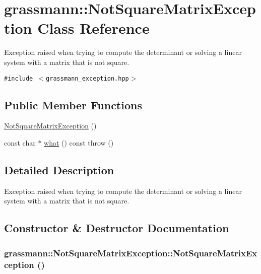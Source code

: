 \hypertarget{classgrassmann_1_1NotSquareMatrixException}{
\section{grassmann::NotSquareMatrixException Class Reference}
\label{classgrassmann_1_1NotSquareMatrixException}
}
Exception raised when trying to compute the determinant or solving a linear system with a matrix that is not square.  


{\tt \#include $<$grassmann\_\-exception.hpp$>$}

\subsection*{Public Member Functions}
\begin{CompactItemize}
\item 
\hyperlink{classgrassmann_1_1NotSquareMatrixException_61fd3c48f615478da87b29f2e1d95037}{NotSquareMatrixException} ()
\item 
const char $\ast$ \hyperlink{classgrassmann_1_1NotSquareMatrixException_2ea102b17f39f32f36dcc315a2ba473c}{what} () const   throw ()
\end{CompactItemize}


\subsection{Detailed Description}
Exception raised when trying to compute the determinant or solving a linear system with a matrix that is not square. 

\subsection{Constructor \& Destructor Documentation}
\hypertarget{classgrassmann_1_1NotSquareMatrixException_61fd3c48f615478da87b29f2e1d95037}{
\subsubsection[NotSquareMatrixException]{\setlength{\rightskip}{0pt plus 5cm}grassmann::NotSquareMatrixException::NotSquareMatrixException ()}}
\label{classgrassmann_1_1NotSquareMatrixException_61fd3c48f615478da87b29f2e1d95037}




